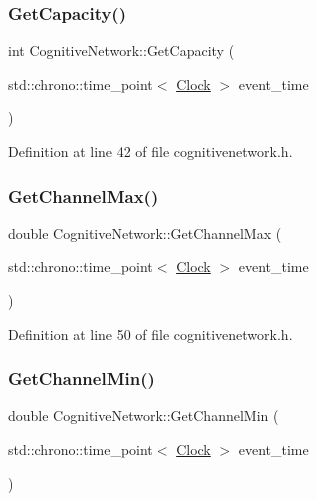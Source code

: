 \subsubsection{\texorpdfstring{Get\+Capacity()}{GetCapacity()}}
{\footnotesize\ttfamily int Cognitive\+Network\+::\+Get\+Capacity (\begin{DoxyParamCaption}\item[{std\+::chrono\+::time\+\_\+point$<$ \hyperlink{universe_8h_a0ef8d951d1ca5ab3cfaf7ab4c7a6fd80}{Clock} $>$}]{event\+\_\+time }\end{DoxyParamCaption})\hspace{0.3cm}{\ttfamily [inline]}}



Definition at line 42 of file cognitivenetwork.\+h.

\mbox{\label{class_cognitive_network_ab67da8690b83618d88f88411121d7071}} 
\subsubsection{\texorpdfstring{Get\+Channel\+Max()}{GetChannelMax()}}
{\footnotesize\ttfamily double Cognitive\+Network\+::\+Get\+Channel\+Max (\begin{DoxyParamCaption}\item[{std\+::chrono\+::time\+\_\+point$<$ \hyperlink{universe_8h_a0ef8d951d1ca5ab3cfaf7ab4c7a6fd80}{Clock} $>$}]{event\+\_\+time }\end{DoxyParamCaption})\hspace{0.3cm}{\ttfamily [inline]}}



Definition at line 50 of file cognitivenetwork.\+h.

\mbox{\label{class_cognitive_network_ad7f5cc836340017d38c22b57e177fc91}} 
\subsubsection{\texorpdfstring{Get\+Channel\+Min()}{GetChannelMin()}}
{\footnotesize\ttfamily double Cognitive\+Network\+::\+Get\+Channel\+Min (\begin{DoxyParamCaption}\item[{std\+::chrono\+::time\+\_\+point$<$ \hyperlink{universe_8h_a0ef8d951d1ca5ab3cfaf7ab4c7a6fd80}{Clock} $>$}]{event\+\_\+time }\end{DoxyParamCaption})\hspace{0.3cm}{\ttfamily [inline]}}



